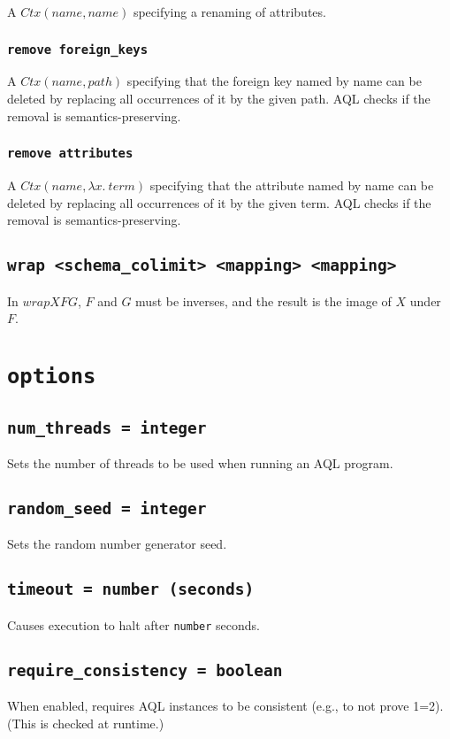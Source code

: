 \documentclass[10pt]{book}
\begin{document}
A $Ctx(name,name)$ specifying a renaming of attributes. 

\subsection{{\tt remove foreign\_keys}}

A $Ctx(name,path)$ specifying that the foreign key named by name can be deleted by replacing all occurrences of it by the given path.  AQL checks if the removal is semantics-preserving. 

\subsection{{\tt remove attributes}}

A $Ctx(name,\lambda x. \ term)$ specifying that the attribute named by name can be deleted by replacing all occurrences of it by the given term.  AQL checks if the removal is semantics-preserving. 
		
\section{{\tt wrap <schema\_colimit> <mapping> <mapping>}}
In $wrap X F G$, $F$ and $G$ must be inverses, and the result is the image of $X$ under $F$.
		
\chapter{{\tt options}}

\section{{\tt num\_threads = integer}}
Sets the number of threads to be used when running an AQL program.

\section{{\tt random\_seed = integer}}
Sets the random number generator seed.

\section{{\tt timeout = number (seconds)}}
Causes execution to halt after {\tt number} seconds.

\section{{\tt require\_consistency = boolean}}
When enabled, requires AQL instances to be consistent (e.g., to not prove 1=2).  (This is checked at runtime.)
\end{document}
